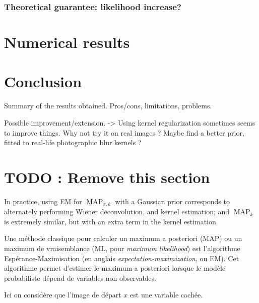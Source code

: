 \documentclass[english,a4paper]{article}
\theoremstyle{plain}
\theoremstyle{definition}
\theoremstyle{remark}
\DeclareMathOperator{\MAP}{MAP}
\begin{document}
\subsubsection{Theoretical guarantee: likelihood increase?}



\section{Numerical results}


\section{Conclusion}
Summary of the results obtained. Pros/cons, limitations, problems.

Possible improvement/extension. -> Using kernel regularization sometimes seems to improve things. Why not try it on real images ? Maybe find a better prior, fitted to real-life photographic blur kernels ?



\newpage
\section{TODO : Remove this section}


In practice, using EM for $\MAP_{x,k}$ with a Gaussian prior corresponds to alternately performing Wiener deconvolution, and kernel estimation; and $\MAP_k$ is extremely similar, but with an extra term in the kernel estimation.





Une méthode classique pour calculer un maximum a posteriori (MAP) ou un maximum de vraisemblance (ML, pour \textit{maximum likelihood}) est l'algorithme Espérance-Maximisation (en anglais \textit{expectation-maximization}, ou EM). Cet algorithme permet d'estimer le maximum a posteriori lorsque le modèle probabiliste dépend de variables non observables.

Ici on considère que l'image de départ $x$ est une variable cachée. 





\end{document}
